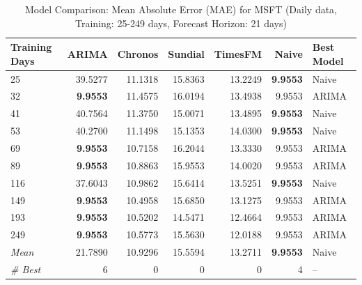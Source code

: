 \begin{table}[htbp]
\centering
\caption{Model Comparison: Mean Absolute Error (MAE) for MSFT (Daily data, Training: 25-249 days, Forecast Horizon: 21 days)}
\label{tab:comparison_MSFT_1d_train-less-year-log_h21_MAE}
\small
\begin{tabular}{lrrrrrl}
\toprule
Training Days & ARIMA & Chronos & Sundial & TimesFM & Naive & Best Model \\
\midrule
25 & 39.5277 & 11.1318 & 15.8363 & 13.2249 & \textbf{9.9553} & Naive \\
32 & \textbf{9.9553} & 11.4575 & 16.0194 & 13.4938 & 9.9553 & ARIMA \\
41 & 40.7564 & 11.3750 & 15.0071 & 13.4895 & \textbf{9.9553} & Naive \\
53 & 40.2700 & 11.1498 & 15.1353 & 14.0300 & \textbf{9.9553} & Naive \\
69 & \textbf{9.9553} & 10.7158 & 16.2044 & 13.3330 & 9.9553 & ARIMA \\
89 & \textbf{9.9553} & 10.8863 & 15.9553 & 14.0020 & 9.9553 & ARIMA \\
116 & 37.6043 & 10.9862 & 15.6414 & 13.5251 & \textbf{9.9553} & Naive \\
149 & \textbf{9.9553} & 10.4958 & 15.6850 & 13.1275 & 9.9553 & ARIMA \\
193 & \textbf{9.9553} & 10.5202 & 14.5471 & 12.4664 & 9.9553 & ARIMA \\
249 & \textbf{9.9553} & 10.5773 & 15.5630 & 12.0188 & 9.9553 & ARIMA \\
\midrule
\textit{Mean} & 21.7890 & 10.9296 & 15.5594 & 13.2711 & \textbf{9.9553} & Naive \\
\textit{\# Best} & 6 & 0 & 0 & 0 & 4 & -- \\
\bottomrule
\end{tabular}
\end{table}